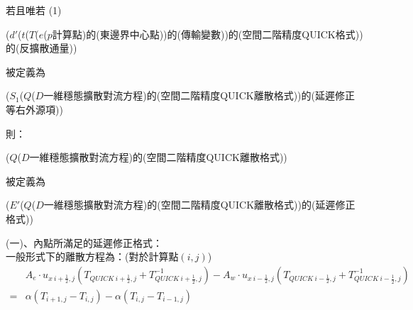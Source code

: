 \documentclass[12pt]{article}
\begin{document}
\noindent 若且唯若
    (1) \begin{center}($d'$($t$($T$($e$($p$計算點)的(東邊界中心點))的(傳輸變數))的(空間二階精度QUICK格式))的(反擴散通量))\end{center}
    被定義為
\begin{center}($S_{1}$($Q$($D$一維穩態擴散對流方程)的(空間二階精度QUICK離散格式))的(延遲修正等右外源項))\end{center}
\noindent 則：
\begin{center}($Q$($D$一維穩態擴散對流方程)的(空間二階精度QUICK離散格式))\end{center}
    被定義為
\begin{center}($E'$($Q$($D$一維穩態擴散對流方程)的(空間二階精度QUICK離散格式))的(延遲修正格式))\end{center}

\noindent (一)、內點所滿足的延遲修正格式：\\

\noindent 一般形式下的離散方程為：(對於計算點$(i,j)$)\\
\begin{equation}
    \begin{split}
        &A_{e}\cdot u_{x\ i+\frac{1}{2},j}(T_{QUICK\ i+\frac{1}{2},j} + T_{QUICK\ i+\frac{1}{2},j}^{-1}) - A_{w}\cdot u_{x\ i-\frac{1}{2},j}(T_{QUICK\ i-\frac{1}{2},j} + T_{QUICK\ i-\frac{1}{2},j}^{-1})\\
        =&\alpha(T_{i+1,j} - T_{i,j}) - \alpha(T_{i,j} - T_{i-1,j})
    \end{split}
\end{equation}
\end{document}
